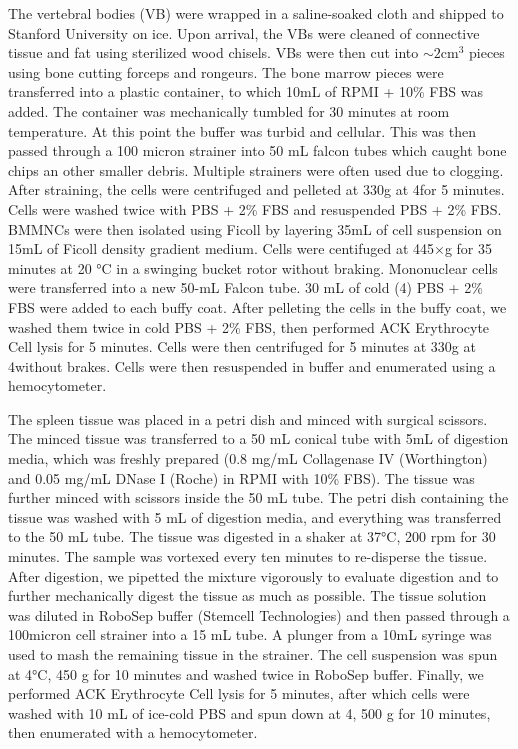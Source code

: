  The vertebral bodies (VB) were wrapped in a saline-soaked cloth and shipped to Stanford University on ice. Upon arrival, the VBs were cleaned of connective tissue and fat using sterilized wood chisels. VBs were then cut into $\sim 2\mathrm{cm}^3$ pieces using bone cutting forceps and rongeurs. The bone marrow pieces were transferred into a plastic container, to which 10mL of RPMI + 10\% FBS was added. The container was mechanically tumbled for 30 minutes at room temperature. At this point the buffer was turbid and cellular. This was then passed through a 100 micron strainer into 50 mL falcon tubes which caught bone chips an other smaller debris. Multiple strainers were often used due to clogging. After straining, the cells were centrifuged and pelleted at 330g at 4\celsius for 5 minutes. Cells were washed twice with PBS + 2\% FBS and resuspended PBS + 2\% FBS. BMMNCs were then isolated using Ficoll by layering 35mL of cell suspension on 15mL of Ficoll density gradient medium. Cells were centifuged at 445×g for 35 minutes at 20 °C in a swinging bucket rotor without braking. Mononuclear cells were transferred into a new 50-mL Falcon tube. 30 mL of cold (4\celsius) PBS + 2\% FBS were added to each buffy coat. After pelleting the cells in the buffy coat, we washed them twice in cold PBS + 2\% FBS, then performed ACK Erythrocyte Cell lysis for 5 minutes. Cells were then centrifuged for 5 minutes at 330g at 4\celsius without brakes. Cells were then resuspended in buffer and enumerated using a hemocytometer.

The spleen tissue was placed in a petri dish and minced with surgical scissors.  The minced tissue was transferred to a 50 mL conical tube with 5mL  of digestion media, which was freshly prepared (0.8 mg/mL Collagenase IV (Worthington) and 0.05 mg/mL DNase I (Roche) in RPMI with 10\% FBS). The tissue was further minced with scissors inside the 50 mL tube. The petri dish containing the tissue was washed with 5 mL of digestion media, and everything was transferred to the 50 mL tube. The tissue was digested in a shaker at 37°C, 200 rpm for 30 minutes.
The sample was vortexed every ten minutes to re-disperse the tissue. After digestion, we pipetted the mixture vigorously to evaluate digestion and to further mechanically digest the tissue as much as possible. The tissue solution was diluted in RoboSep buffer (Stemcell Technologies) and then passed through a 100micron cell strainer into a 15 mL tube. A plunger from a 10mL syringe was used to mash the remaining tissue in the strainer. The cell suspension was spun at 4°C, 450 g for 10 minutes and washed twice in RoboSep buffer. Finally, we performed ACK Erythrocyte Cell lysis for 5 minutes, after which cells were washed with 10 mL of ice-cold PBS and spun down at 4\celsius, 500 g for 10 minutes, then enumerated with a hemocytometer.

